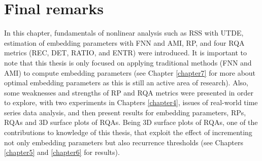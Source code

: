 %


\newpage
\section{Final remarks}
In this chapter, fundamentals of nonlinear analysis such 
as RSS with UTDE, estimation of embedding parameters with FNN and AMI, RP, 
and four RQA metrics (REC, DET, RATIO, and ENTR) were introduced. 
It is important to note that this thesis is only focused on
applying traditional methods (FNN and AMI) to compute embedding parameters 
(see Chapter \ref{chapter7} for more about optimal embedding parameters
as this is still an active area of research).
Also, some weaknesses and strengths of RP and RQA metrics were presented
in order to explore, with two experiments in Chapters \ref{chapter4}, 
issues of real-world time series data analysis, 
and then present results for embedding parameters, RPs, RQAs and
3D surface plots of RQAs. 
Being 3D surface plots of RQAs, one of the contributions to
knowledge of this thesis, that exploit the effect of incrementing 
not only embedding parameters \citep{iwanski1998} but also 
recurrence thresholds 
(see Chapters \ref{chapter5} and \ref{chapter6} for results).

